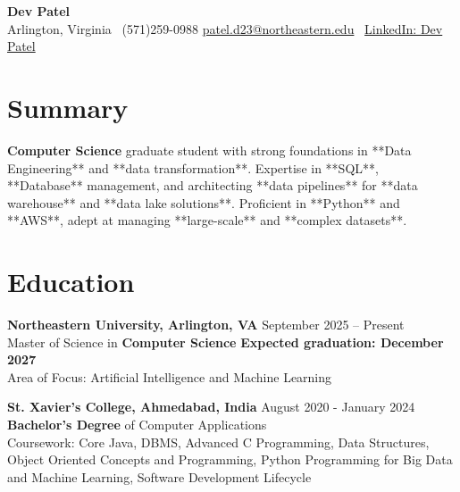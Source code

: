 \documentclass[a4paper,10pt]{article}
\begin{document}
\begin{center}
\vspace{-3mm}
    \fontsize{16}{18}\selectfont \textbf{Dev Patel} \\
    \vspace{0mm}
    \normalsize Arlington, Virginia \textbar\ (571)259-0988  \textbar       \href{mailto:patel.d23@northeastern.edu}{patel.d23@northeastern.edu} \textbar\ \href{https://www.linkedin.com/in/devxpatel//}{LinkedIn: Dev Patel} \\
\end{center}



\section*{Summary}
\textbf{Computer Science} graduate student with strong foundations in **Data Engineering** and **data transformation**. Expertise in **SQL**, **Database** management, and architecting **data pipelines** for **data warehouse** and **data lake solutions**. Proficient in **Python** and **AWS**, adept at managing **large-scale** and **complex datasets**.
 
\vspace{ 0 mm}
\section*{Education}
\textbf{Northeastern University, Arlington, VA} \hfill September 2025 -- Present\\
Master of Science in \textbf{Computer Science} \hfill \textbf{Expected graduation: December 2027} \\
Area of Focus: Artificial Intelligence and Machine Learning

\vspace{1 mm} %
\textbf{St. Xavier's College, Ahmedabad, India} \hfill August 2020 - January 2024 \\
\textbf{Bachelor’s Degree} of Computer Applications\\
Coursework: Core Java, DBMS, Advanced C Programming, Data Structures, Object Oriented Concepts and Programming, Python Programming for Big Data and Machine Learning, Software Development Lifecycle
\end{document}
